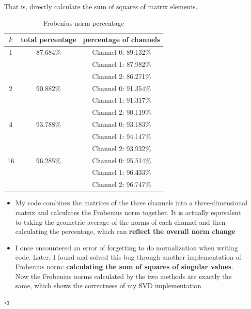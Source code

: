 \documentclass[11pt]{article}
\newenvironment{answer}[1][Answer]{\begin{trivlist}
\item[\hskip \labelsep {\bfseries #1.}\hskip \labelsep]}{\hfill$\lhd$\end{trivlist}}
\begin{document}
\begin{answer}
\begin{itemize}
That is, directly calculate the sum of squares of matrix elements.
\begin{table}[!htbp]
    \centering
    \caption{Frobenius norm percentage}
    \begin{tabular}{ccc}
        \toprule
        $k$ & total percentage & percentage of channels \\
        \midrule
        1 & 87.684\% & Channel 0: 89.132\% \\
          &         & Channel 1: 87.982\% \\
          &         & Channel 2: 86.271\% \\
        \hline
        2 & 90.882\% & Channel 0: 91.354\% \\
          &         & Channel 1: 91.317\% \\
          &         & Channel 2: 90.119\% \\
        \hline
        4 & 93.788\% & Channel 0: 93.183\% \\
          &         & Channel 1: 94.147\% \\
          &         & Channel 2: 93.932\% \\
        \hline
        16 & 96.285\% & Channel 0: 95.514\% \\
           &         & Channel 1: 96.433\% \\
           &         & Channel 2: 96.747\% \\
        \bottomrule
    \end{tabular}
    \label{tab:frobenius}
\end{table}
\begin{itemize}
\item My code combines the matrices of the three channels into a three-dimensional matrix and calculates the Frobenius norm together. It is actually equivalent to taking the geometric average of the norms of each channel and then calculating the percentage, which can \textbf{reflect the overall norm change}
\item I once encountered an error of forgetting to do normalization when writing code. Later, I found and solved this bug through another implementation of Frobenius norm:\textbf{ calculating the sum of squares of singular values}. Now the Frobenius norms calculated by the two methods are exactly the same, which shows the correctness of my SVD implementation
\end{itemize}

\end{itemize}
\end{answer}
\end{document}
